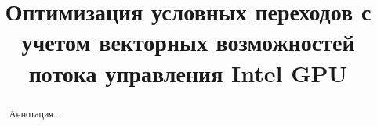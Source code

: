 \documentclass[conference,letterpaper]{IEEEtran}
\begin{document}

\title{Оптимизация условных переходов с учетом векторных возможностей
        потока управления Intel GPU\\
}
\author{
\IEEEauthorblockA{
\textit{}\\
\\}
}
\maketitle
\begin{abstract}
  Аннотация...
\end{abstract}









\end{document}
